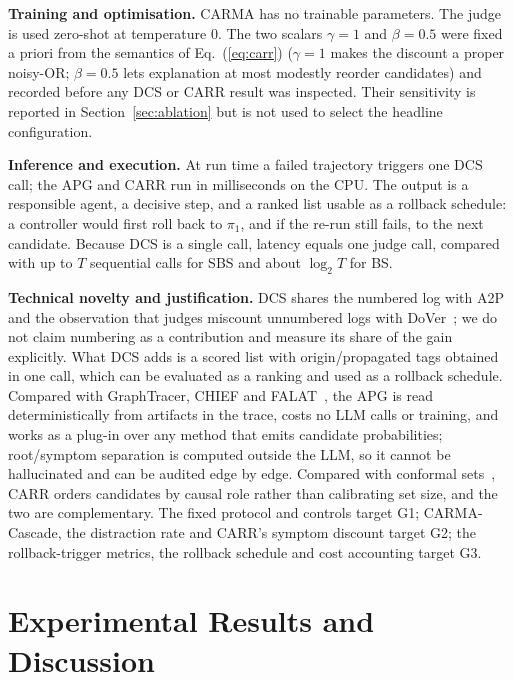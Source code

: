 \documentclass[conference]{IEEEtran}
\begin{document}
\textbf{Training and optimisation.} CARMA has no trainable parameters. The judge is used zero-shot at temperature 0. The two scalars $\gamma=1$ and $\beta=0.5$ were fixed a priori from the semantics of Eq.~(\ref{eq:carr}) ($\gamma=1$ makes the discount a proper noisy-OR; $\beta=0.5$ lets explanation at most modestly reorder candidates) and recorded before any DCS or CARR result was inspected. Their sensitivity is reported in Section~\ref{sec:ablation} but is not used to select the headline configuration.

\textbf{Inference and execution.} At run time a failed trajectory triggers one DCS call; the APG and CARR run in milliseconds on the CPU. The output is a responsible agent, a decisive step, and a ranked list usable as a rollback schedule: a controller would first roll back to $\pi_1$, and if the re-run still fails, to the next candidate. Because DCS is a single call, latency equals one judge call, compared with up to $T$ sequential calls for SBS and about $\log_2 T$ for BS.

\textbf{Technical novelty and justification.} DCS shares the numbered log with A2P~\cite{west2025a2p} and the observation that judges miscount unnumbered logs with DoVer~\cite{ma2025dover}; we do not claim numbering as a contribution and measure its share of the gain explicitly. What DCS adds is a scored list with origin/propagated tags obtained in one call, which can be evaluated as a ranking and used as a rollback schedule. Compared with GraphTracer, CHIEF and FALAT~\cite{zhang2025graphtracer,wang2026chief,rafi2026falat}, the APG is read deterministically from artifacts in the trace, costs no LLM calls or training, and works as a plug-in over any method that emits candidate probabilities; root/symptom separation is computed outside the LLM, so it cannot be hallucinated and can be audited edge by edge. Compared with conformal sets~\cite{feng2026conformal}, CARR orders candidates by causal role rather than calibrating set size, and the two are complementary. The fixed protocol and controls target G1; CARMA-Cascade, the distraction rate and CARR's symptom discount target G2; the rollback-trigger metrics, the rollback schedule and cost accounting target G3.

\section{Experimental Results and Discussion}\label{sec:exp}
\end{document}
